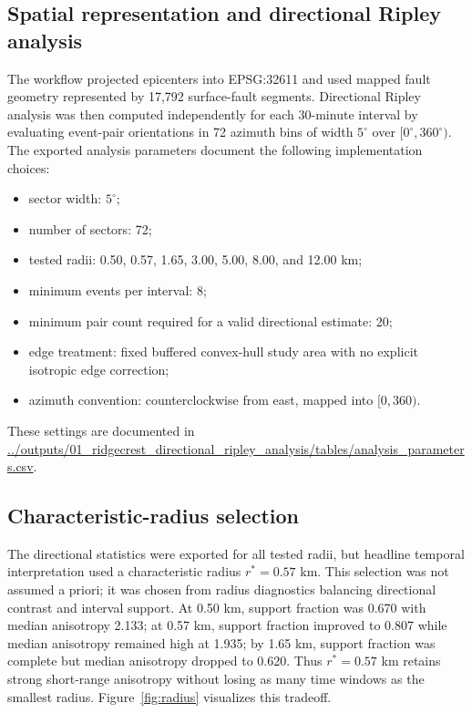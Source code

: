 \documentclass[11pt]{article}
\begin{document}
\subsection{Spatial representation and directional Ripley analysis}
The workflow projected epicenters into EPSG:32611 and used mapped fault geometry represented by 17,792 surface-fault segments. Directional Ripley analysis was then computed independently for each 30-minute interval by evaluating event-pair orientations in 72 azimuth bins of width $5^{\circ}$ over $[0^{\circ},360^{\circ})$. The exported analysis parameters document the following implementation choices:
\begin{itemize}[leftmargin=2em]
    \item sector width: $5^{\circ}$;
    \item number of sectors: 72;
    \item tested radii: 0.50, 0.57, 1.65, 3.00, 5.00, 8.00, and 12.00 km;
    \item minimum events per interval: 8;
    \item minimum pair count required for a valid directional estimate: 20;
    \item edge treatment: fixed buffered convex-hull study area with no explicit isotropic edge correction;
    \item azimuth convention: counterclockwise from east, mapped into $[0,360)$.
\end{itemize}
These settings are documented in
\url{../outputs/01_ridgecrest_directional_ripley_analysis/tables/analysis_parameters.csv}.

\subsection{Characteristic-radius selection}
The directional statistics were exported for all tested radii, but headline temporal interpretation used a characteristic radius $r^{\ast}=0.57$ km. This selection was not assumed a priori; it was chosen from radius diagnostics balancing directional contrast and interval support. At 0.50 km, support fraction was 0.670 with median anisotropy 2.133; at 0.57 km, support fraction improved to 0.807 while median anisotropy remained high at 1.935; by 1.65 km, support fraction was complete but median anisotropy dropped to 0.620. Thus $r^{\ast}=0.57$ km retains strong short-range anisotropy without losing as many time windows as the smallest radius. Figure~\ref{fig:radius} visualizes this tradeoff.
\end{document}
